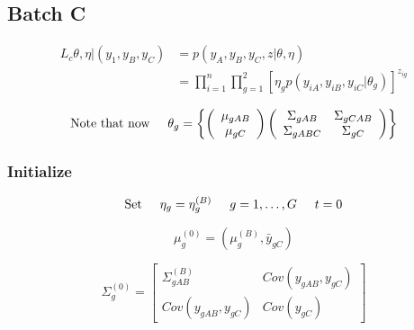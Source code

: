 \documentclass[a4paper,12pt]{article}\usepackage[]{graphicx}\usepackage[]{color}
\begin{document}
\subsection{Batch C}

\noindent{}
\begin{align*}
L_{c}{\theta, \eta | \left( y_{1}, y_{B}, y_{C}\right)} &= p \left(y_{A}, y_{B}, y_{C}, z | \theta, \eta \right)\\
&= \prod_{i=1}^{n} \prod_{g=1}^2 \left[\eta_{g} p \left(y_{iA},y_{iB}, y_{iC}| \theta_{g} \right)\right]^{z_{ig}}
\end{align*}

\[
\text{Note that now} \hspace{5mm}
\theta_{g} = \left\{
\left(\begin{array}{c}
\mu_{gAB} \\
\mu_{gC} \end{array} \right)
\left(\begin{array}{cc}
\Sigma_{gAB} & \Sigma_{gCAB} \\
\Sigma_{gABC} & \Sigma_{gC}\end{array}\right)
\right\}
\]
\subsubsection*{Initialize}
\[
\text{Set} \hspace{5mm} \eta_{g}=\eta_{g}^{\left(B \right)}  \hspace{5mm} g=1,\ldots,G \hspace{5mm} t=0
\]

\[
\mu_{g}^{\left(0 \right)}=\left(\mu_{g}^{\left(B\right)}, \bar{y}_{gC}\right)
\]

\[
\Sigma_{g}^{\left(0\right)}=
\left[\begin{array}{cc}
\Sigma_{gAB}^{\left(B \right)} & Cov\left(y_{gAB}, y_{gC} \right) \\
Cov \left(y_{gAB},y_{gC} \right) & Cov\left(y_{gC} \right)\end{array}\right]
\]
\end{document}
